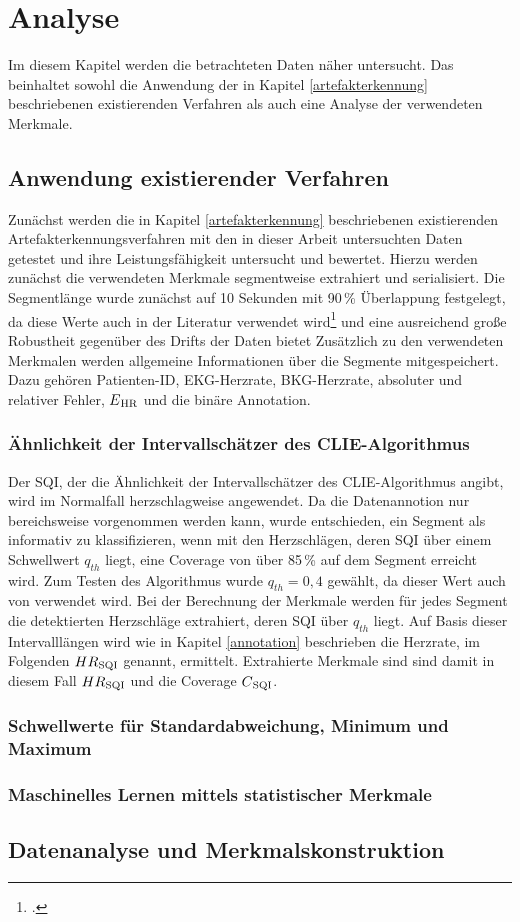 \chapter{Analyse}\label{analyse}

Im diesem Kapitel werden die betrachteten Daten näher untersucht. Das beinhaltet sowohl die Anwendung der in Kapitel \ref{artefakterkennung} beschriebenen existierenden Verfahren als auch eine Analyse der verwendeten Merkmale.


\section{Anwendung existierender Verfahren}

Zunächst werden die in Kapitel \ref{artefakterkennung} beschriebenen existierenden Artefakterkennungsverfahren mit den in dieser Arbeit untersuchten Daten getestet und  ihre Leistungsfähigkeit untersucht und bewertet. Hierzu werden zunächst die verwendeten Merkmale segmentweise extrahiert und serialisiert. Die Segmentlänge wurde zunächst auf 10 Sekunden mit 90\,\% Überlappung festgelegt, da diese Werte auch in der Literatur verwendet wird\footcite[Vgl.][]{Yu2020} und eine ausreichend große Robustheit gegenüber des Drifts der Daten bietet Zusätzlich zu den verwendeten Merkmalen werden allgemeine Informationen über die Segmente mitgespeichert. Dazu gehören Patienten-ID, EKG-Herzrate, BKG-Herzrate, absoluter und relativer Fehler, $E\textsubscript{HR}$ und die binäre Annotation.

\subsection{Ähnlichkeit der Intervallschätzer des CLIE-Algorithmus}

Der \ac{SQI}, der die Ähnlichkeit der Intervallschätzer des \ac{CLIE}-Algorithmus angibt, wird im Normalfall herzschlagweise angewendet. Da die Datenannotion nur bereichsweise vorgenommen werden kann, wurde entschieden, ein Segment als informativ zu klassifizieren, wenn mit den Herzschlägen, deren \ac{SQI} über einem Schwellwert $q_{th}$ liegt, eine Coverage von über 85\,\% auf dem Segment erreicht wird. Zum Testen des Algorithmus wurde $q_{th} = 0{,}4$ gewählt, da dieser Wert auch von \citeauthor{Zink2017} verwendet wird. Bei der Berechnung der Merkmale werden für jedes Segment die detektierten Herzschläge extrahiert, deren \ac{SQI} über $q_{th}$ liegt. Auf Basis dieser Intervalllängen wird wie in Kapitel \ref{annotation} beschrieben die Herzrate, im Folgenden $HR\textsubscript{SQI}$ genannt, ermittelt. Extrahierte Merkmale sind sind damit in diesem Fall $HR\textsubscript{SQI}$ und die Coverage $C\textsubscript{SQI}$.




\subsection{Schwellwerte für Standardabweichung, Minimum und Maximum}

\subsection{Maschinelles Lernen mittels statistischer Merkmale}

\section{Datenanalyse und Merkmalskonstruktion}


